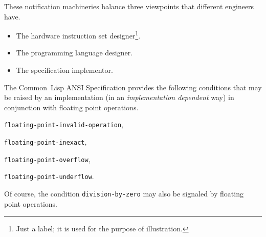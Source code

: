 \documentclass[10pt,fleqn]{article}
\newcommand{\CL}{\textsf{Common~Lisp}}
\newcommand{\code}[1]{\texttt{#1}}
\begin{document}
\noindent
These notification machineries balance three viewpoints that different
engineers have.

\begin{itemize}
\item The hardware instruction set designer\footnote{Just a label; it
    is used for the purpose of illustration.}.
\item The programming language designer.
\item The specification implementor.
\end{itemize}

The \CL{} ANSI Specification provides the following conditions that
may be raised by an implementation (in an \emph{implementation
  dependent} way) in conjunction with floating point operations.
\begin{description}
\item \code{floating-point-invalid-operation},
\item \code{floating-point-inexact},
\item \code{floating-point-overflow},
\item \code{floating-point-underflow}.
\end{description}
Of course, the condition \code{division-by-zero} may also be signaled
by floating point operations.
\end{document}
